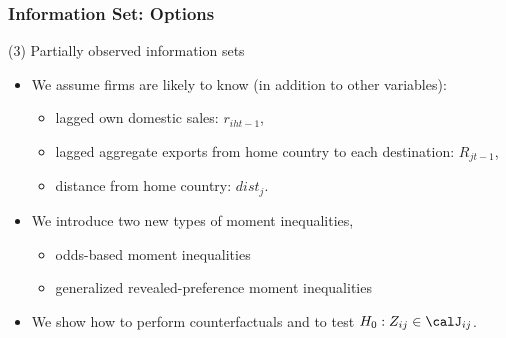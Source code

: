 \begin{frame}[label=mom_ineq_slide]
\frametitle{Information Set: Options}

(3) Partially observed information sets
\begin{itemize}
	\item We assume firms are likely to know (in addition to other variables):
	\begin{itemize}
		\item lagged own domestic sales: $r_{iht-1}$,
		\item lagged aggregate exports from home country to each destination: $R_{jt-1}$,
		\item distance from home country: $dist_{j}$.
	\end{itemize}
	\item We introduce two new types of moment inequalities,
	\begin{itemize}
		\item odds-based moment inequalities
		\item generalized revealed-preference moment inequalities
	\end{itemize}
	\item We show how to perform counterfactuals and to test $H_{0}: Z_{ij}\in\calJ_{ij}$.
\end{itemize}
\end{frame}

